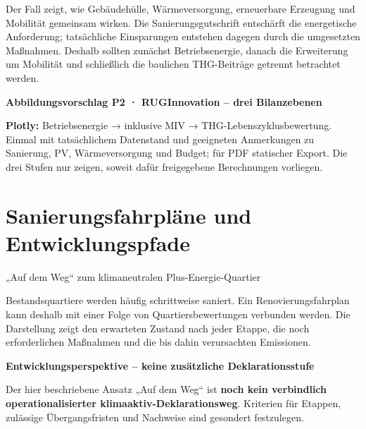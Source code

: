 \documentclass[
  ngerman,
  a4paper,
  DIV=11]{scrreprt}
\begin{document}
Der Fall zeigt, wie Gebäudehülle, Wärmeversorgung, erneuerbare Erzeugung
und Mobilität gemeinsam wirken. Die Sanierungsgutschrift entschärft die
energetische Anforderung; tatsächliche Einsparungen entstehen dagegen
durch die umgesetzten Maßnahmen. Deshalb sollten zunächst
Betriebsenergie, danach die Erweiterung um Mobilität und schließlich die
baulichen THG-Beiträge getrennt betrachtet werden.

\begin{tcolorbox}[enhanced jigsaw, arc=.35mm, bottomrule=.15mm, breakable, colback=white, colframe=quarto-callout-note-color-frame, left=2mm, leftrule=.75mm, opacityback=0, rightrule=.15mm, toprule=.15mm]

\vspace{-3mm}\textbf{Abbildungsvorschlag P2 · RUGInnovation -- drei Bilanzebenen}\vspace{3mm}

\textbf{Plotly:} Betriebsenergie → inklusive MIV →
THG-Lebenszyklusbewertung. Einmal mit tatsächlichem Datenstand und
geeigneten Anmerkungen zu Sanierung, PV, Wärmeversorgung und Budget; für
PDF statischer Export. Die drei Stufen nur zeigen, soweit dafür
freigegebene Berechnungen vorliegen.

\end{tcolorbox}

\chapter{Sanierungsfahrpläne und
Entwicklungspfade}\label{sec-renovierungsfahrplan}

„Auf dem Weg`` zum klimaneutralen Plus-Energie-Quartier

Bestandsquartiere werden häufig schrittweise saniert. Ein
Renovierungsfahrplan kann deshalb mit einer Folge von
Quartiersbewertungen verbunden werden. Die Darstellung zeigt den
erwarteten Zustand nach jeder Etappe, die noch erforderlichen Maßnahmen
und die bis dahin verursachten Emissionen.

\begin{tcolorbox}[enhanced jigsaw, arc=.35mm, bottomrule=.15mm, breakable, colback=white, colframe=quarto-callout-warning-color-frame, left=2mm, leftrule=.75mm, opacityback=0, rightrule=.15mm, toprule=.15mm]

\vspace{-3mm}\textbf{Entwicklungsperspektive -- keine zusätzliche Deklarationsstufe}\vspace{3mm}

Der hier beschriebene Ansatz „Auf dem Weg`` ist \textbf{noch kein
verbindlich operationalisierter klimaaktiv-Deklarationsweg}. Kriterien
für Etappen, zulässige Übergangsfristen und Nachweise sind gesondert
festzulegen.

\end{tcolorbox}
\end{document}
